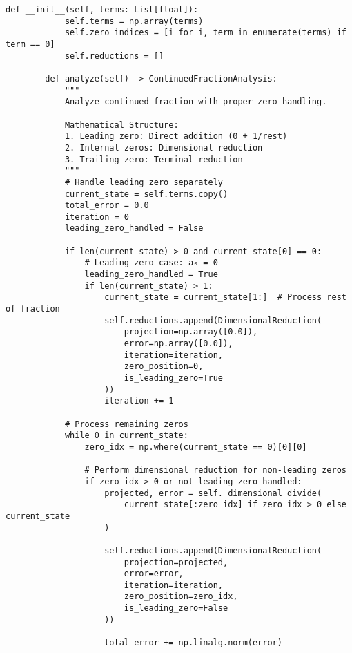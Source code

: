 \begin{lstlisting}[caption={Enhanced Continued Fraction Analysis Framework},label={lst:analysis-code}]
        def __init__(self, terms: List[float]):
            self.terms = np.array(terms)
            self.zero_indices = [i for i, term in enumerate(terms) if term == 0]
            self.reductions = []
            
        def analyze(self) -> ContinuedFractionAnalysis:
            """
            Analyze continued fraction with proper zero handling.
            
            Mathematical Structure:
            1. Leading zero: Direct addition (0 + 1/rest)
            2. Internal zeros: Dimensional reduction
            3. Trailing zero: Terminal reduction
            """
            # Handle leading zero separately
            current_state = self.terms.copy()
            total_error = 0.0
            iteration = 0
            leading_zero_handled = False
            
            if len(current_state) > 0 and current_state[0] == 0:
                # Leading zero case: a₀ = 0
                leading_zero_handled = True
                if len(current_state) > 1:
                    current_state = current_state[1:]  # Process rest of fraction
                    self.reductions.append(DimensionalReduction(
                        projection=np.array([0.0]),
                        error=np.array([0.0]),
                        iteration=iteration,
                        zero_position=0,
                        is_leading_zero=True
                    ))
                    iteration += 1
            
            # Process remaining zeros
            while 0 in current_state:
                zero_idx = np.where(current_state == 0)[0][0]
                
                # Perform dimensional reduction for non-leading zeros
                if zero_idx > 0 or not leading_zero_handled:
                    projected, error = self._dimensional_divide(
                        current_state[:zero_idx] if zero_idx > 0 else current_state
                    )
                    
                    self.reductions.append(DimensionalReduction(
                        projection=projected,
                        error=error,
                        iteration=iteration,
                        zero_position=zero_idx,
                        is_leading_zero=False
                    ))
                    
                    total_error += np.linalg.norm(error)
                    

\end{lstlisting}
